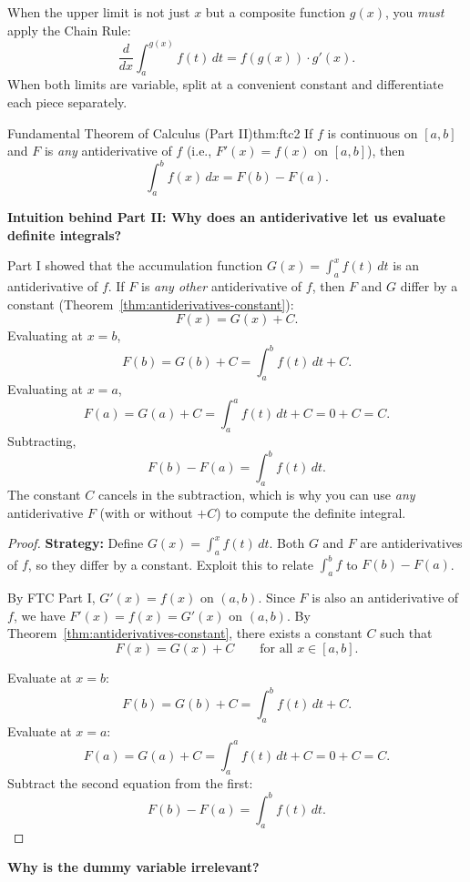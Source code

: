 \begin{examtip}[title={Exam Focus: Variable limits and Chain Rule}]
When the upper limit is not just $x$ but a composite function $g(x)$, you \emph{must} apply the Chain Rule:
\[
\frac{d}{dx}\int_a^{g(x)} f(t)\,dt = f(g(x))\cdot g'(x).
\]
When both limits are variable, split at a convenient constant and differentiate each piece separately.
\end{examtip}

\vspace{1em}

\begin{theorem}{Fundamental Theorem of Calculus (Part II)}{thm:ftc2}
If $f$ is continuous on $[a,b]$ and $F$ is \emph{any} antiderivative of $f$ (i.e., $F'(x)=f(x)$ on $[a,b]$), then
\[
\int_a^b f(x)\,dx = F(b)-F(a).
\]
\end{theorem}

\textbf{Intuition behind Part II: Why does an antiderivative let us evaluate definite integrals?}

Part I showed that the accumulation function $G(x)=\int_a^x f(t)\,dt$ is an antiderivative of $f$. If $F$ is \emph{any other} antiderivative of $f$, then $F$ and $G$ differ by a constant (Theorem~\ref{thm:antiderivatives-constant}):
\[
F(x)=G(x)+C.
\]
Evaluating at $x=b$,
\[
F(b)=G(b)+C=\int_a^b f(t)\,dt + C.
\]
Evaluating at $x=a$,
\[
F(a)=G(a)+C=\int_a^a f(t)\,dt + C = 0+C=C.
\]
Subtracting,
\[
F(b)-F(a)=\int_a^b f(t)\,dt.
\]
The constant $C$ cancels in the subtraction, which is why you can use \emph{any} antiderivative $F$ (with or without $+C$) to compute the definite integral.

\begin{proof}
\textbf{Strategy:} Define $G(x)=\int_a^x f(t)\,dt$. Both $G$ and $F$ are antiderivatives of $f$, so they differ by a constant. Exploit this to relate $\int_a^b f$ to $F(b)-F(a)$.

By FTC Part I, $G'(x)=f(x)$ on $(a,b)$. Since $F$ is also an antiderivative of $f$, we have $F'(x)=f(x)=G'(x)$ on $(a,b)$. By Theorem~\ref{thm:antiderivatives-constant}, there exists a constant $C$ such that
\[
F(x)=G(x)+C \qquad \text{for all }x\in[a,b].
\]

Evaluate at $x=b$:
\[
F(b)=G(b)+C=\int_a^b f(t)\,dt + C.
\]
Evaluate at $x=a$:
\[
F(a)=G(a)+C=\int_a^a f(t)\,dt + C = 0+C=C.
\]
Subtract the second equation from the first:
\[
F(b)-F(a)=\int_a^b f(t)\,dt.
\]
\end{proof}

\textbf{Why is the dummy variable irrelevant?}

